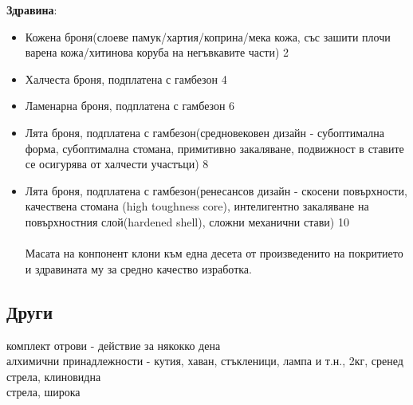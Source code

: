 



\textbf{Здравина}:
\begin{itemize}[topsep=-0cm, partopsep=0cm, parsep=0cm, itemsep=0cm]
\item{Кожена броня(слоеве памук/хартия/коприна/мека кожа, със зашити плочи варена кожа/хитинова коруба на негъвкавите части) 2}
\item{Халчеста броня, подплатена с гамбезон 4}
\item{Ламенарна броня, подплатена с гамбезон 6}
\item{Лята броня, подплатена с гамбезон(средновековен дизайн - субоптимална форма, субоптимална стомана, примитивно закаляване, подвижност в ставите се осигурява от халчести участъци) 8}
\item{Лята броня, подплатена с гамбезон(ренесансов дизайн - скосени повърхности, качествена стомана (high toughness core),  интелигентно закаляване на повърхностния слой(hardened shell), сложни механични стави) 10}
\\
\\
Масата на конпонент клони към една десета от произведенито на покритието и здравината му за средно качество изработка.
\end{itemize}

\subsection{Други}
комплект отрови - действие за някокко дена \\
алхимични принадлежности - кутия, хаван, стъкленици, лампа и т.н., 2кг, сренед  \\
стрела, клиновидна  \\
стрела, широка  \\
